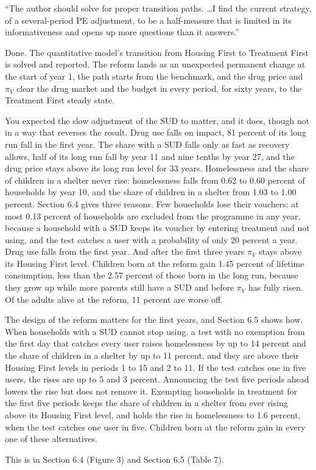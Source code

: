 \documentclass[11pt]{article}
\begin{document}
\begin{referee}
``The author should solve for proper transition paths. \dots I find the current
strategy, of a several-period PE adjustment, to be a half-measure that is limited
in its informativeness and opens up more questions than it answers.''
\end{referee}
\begin{response}
\newresult Done. The quantitative model's transition from Housing First to
Treatment First is solved and reported. The reform lands as an unexpected
permanent change at the start of year 1, the path starts from the benchmark, and
the drug price and $\pi_V$ clear the drug market and the budget in every period,
for sixty years, to the Treatment First steady state.

You expected the slow adjustment of the SUD to matter, and it does, though not in
a way that reverses the result. Drug use falls on impact, 81 percent of its long
run fall in the first year. The share with a SUD falls only as fast as recovery
allows, half of its long run fall by year 11 and nine tenths by year 27, and the
drug price stays above its long run level for 33 years. Homelessness and the share
of children in a shelter never rise: homelessness falls from 0.62 to 0.60 percent
of households by year 10, and the share of children in a shelter from 1.03 to 1.00
percent. Section 6.4 gives three reasons. Few households lose their vouchers: at
most 0.13 percent of households are excluded from the programme in any year,
because a household with a SUD keeps its voucher by entering treatment and not
using, and the test catches a user with a probability of only 20 percent a year.
Drug use falls from the first year. And after the first three years $\pi_V$ stays
above its Housing First level. Children born at the reform gain 1.45 percent of
lifetime consumption, less than the 2.57 percent of those born in the long run,
because they grow up while more parents still have a SUD and before $\pi_V$ has
fully risen. Of the adults alive at the reform, 11 percent are worse off.

The design of the reform matters for the first years, and Section 6.5 shows how.
When households with a SUD cannot stop using, a test with no exemption from the
first day that catches every user raises homelessness by up to 14 percent and the
share of children in a shelter by up to 11 percent, and they are above their
Housing First levels in periods 1 to 15 and 2 to 11. If the test catches one in
five users, the rises are up to 5 and 3 percent. Announcing the test five periods
ahead lowers the rise but does not remove it. Exempting households in treatment
for the first five periods keeps the share of children in a shelter from ever
rising above its Housing First level, and holds the rise in homelessness to 1.6
percent, when the test catches one user in five. Children born at the reform gain
in every one of these alternatives.

This is in Section 6.4 (Figure 3) and Section 6.5 (Table 7).
\end{response}
\end{document}
